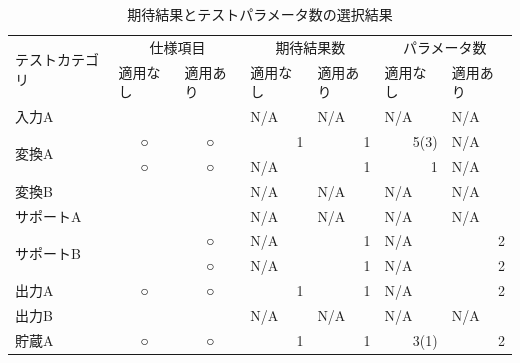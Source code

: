 \begin{table}[htbp]
  \centering
  \caption{期待結果とテストパラメータ数の選択結果}
    \begin{tabular}{|l|r|r|r|r|r|r|}
    \hline
    \multirow{2}[4]{*}{テストカテゴリ} & \multicolumn{2}{c|}{仕様項目} & \multicolumn{2}{c|}{期待結果数} & \multicolumn{2}{c|}{パラメータ数} \bigstrut\\
\cline{2-7}          & \multicolumn{1}{l|}{適用なし} & \multicolumn{1}{l|}{適用あり} & \multicolumn{1}{l|}{適用なし} & \multicolumn{1}{l|}{適用あり} & \multicolumn{1}{l|}{適用なし} & \multicolumn{1}{l|}{適用あり} \bigstrut\\
    \hline
    入力A   &       &       & \multicolumn{1}{l|}{N/A} & \multicolumn{1}{l|}{N/A} & \multicolumn{1}{l|}{N/A} & \multicolumn{1}{l|}{N/A} \bigstrut\\
    \hline
    \multirow{2}[4]{*}{変換A} & \multicolumn{1}{c|}{○} & \multicolumn{1}{c|}{○} & 1     & 1     & 5(3)  & \multicolumn{1}{l|}{N/A} \bigstrut\\
\cline{2-7}          & \multicolumn{1}{c|}{○} & \multicolumn{1}{c|}{○} & \multicolumn{1}{l|}{N/A} & 1     & 1     & \multicolumn{1}{l|}{N/A} \bigstrut\\
    \hline
    変換B   &       &       & \multicolumn{1}{l|}{N/A} & \multicolumn{1}{l|}{N/A} & \multicolumn{1}{l|}{N/A} & \multicolumn{1}{l|}{N/A} \bigstrut\\
    \hline
    サポートA &       &       & \multicolumn{1}{l|}{N/A} & \multicolumn{1}{l|}{N/A} & \multicolumn{1}{l|}{N/A} & \multicolumn{1}{l|}{N/A} \bigstrut\\
    \hline
    \multirow{2}[4]{*}{サポートB} &       & \multicolumn{1}{c|}{○} & \multicolumn{1}{l|}{N/A} & 1     & \multicolumn{1}{l|}{N/A} & 2 \bigstrut\\
\cline{2-7}          &       & \multicolumn{1}{c|}{○} & \multicolumn{1}{l|}{N/A} & 1     & \multicolumn{1}{l|}{N/A} & 2 \bigstrut\\
    \hline
    出力A   & \multicolumn{1}{c|}{○} & \multicolumn{1}{c|}{○} & 1     & 1     & \multicolumn{1}{l|}{N/A} & 2 \bigstrut\\
    \hline
    出力B   &       &       & \multicolumn{1}{l|}{N/A} & \multicolumn{1}{l|}{N/A} & \multicolumn{1}{l|}{N/A} & \multicolumn{1}{l|}{N/A} \bigstrut\\
    \hline
    貯蔵A   & \multicolumn{1}{c|}{○} & \multicolumn{1}{c|}{○} & 1     & 1     & 3(1)  & 2 \bigstrut\\

\end{tabular}
\end{table}
